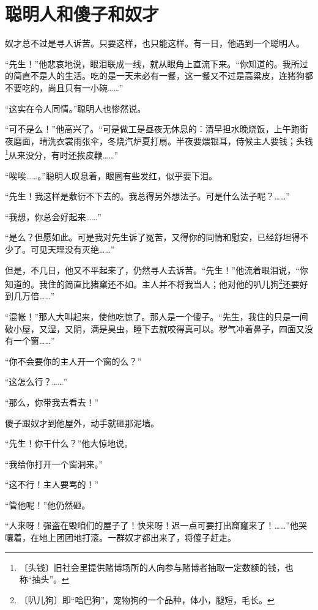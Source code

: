 \documentclass[12pt,UTF-8,openany]{ctexbook}
\begin{document}
\chapter{聪明人和傻子和奴才}

\begin{normalsize}
    
    奴才总不过是寻人诉苦。只要这样，也只能这样。有一日，他遇到一个聪明人。
    
    “先生！”他悲哀地说，眼泪联成一线，就从眼角上直流下来。“你知道的。我所过的简直不是人的生活。吃的是一天未必有一餐，这一餐又不过是高粱皮，连猪狗都不要吃的，尚且只有一小碗……”
    
    “这实在令人同情。”聪明人也惨然说。
    
    “可不是么！”他高兴了。“可是做工是昼夜无休息的：清早担水晚烧饭，上午跑街夜磨面，晴洗衣裳雨张伞，冬烧汽炉夏打扇。半夜要煨银耳，侍候主人要钱；头钱\footnote{〔头钱〕旧社会里提供赌博场所的人向参与赌博者抽取一定数额的钱，也称“抽头”。}从来没分，有时还挨皮鞭……”
    
    “唉唉……。”聪明人叹息着，眼圈有些发红，似乎要下泪。
    
    “先生！我这样是敷衍不下去的。我总得另外想法子。可是什么法子呢？……”
    
    “我想，你总会好起来……”
    
    “是么？但愿如此。可是我对先生诉了冤苦，又得你的同情和慰安，已经舒坦得不少了。可见天理没有灭绝……”
    
    但是，不几日，他又不平起来了，仍然寻人去诉苦。“先生！”他流着眼泪说，“你知道的。我住的简直比猪窠还不如。主人并不将我当人；他对他的叭儿狗\footnote{〔叭儿狗〕即“哈巴狗”，宠物狗的一个品种，体小，腿短，毛长。}还要好到几万倍……”
    
    “混帐！”那人大叫起来，使他吃惊了。那人是一个傻子。“先生，我住的只是一间破小屋，又湿，又阴，满是臭虫，睡下去就咬得真可以。秽气冲着鼻子，四面又没有一个窗……”
    
    “你不会要你的主人开一个窗的么？”
    
    “这怎么行？……”
    
    “那么，你带我去看去！”
    
    傻子跟奴才到他屋外，动手就砸那泥墙。
    
    “先生！你干什么？”他大惊地说。
    
    “我给你打开一个窗洞来。”
    
    “这不行！主人要骂的！”
    
    “管他呢！”他仍然砸。
    
    “人来呀！强盗在毁咱们的屋子了！快来呀！迟一点可要打出窟窿来了！……”他哭嚷着，在地上团团地打滚。一群奴才都出来了，将傻子赶走。
    

\end{normalsize}
\end{document}
